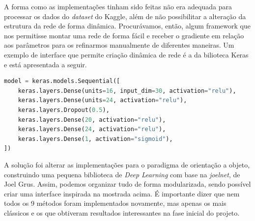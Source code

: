 \documentclass[11pt]{article}
\begin{document}
A forma como as implementações tinham sido feitas não era adequada para processar os dados do \textit{dataset} do Kaggle, além de não possibilitar a alteração da estrutura da rede de forma dinâmica. Procurávamos, então, algum framework que nos permitisse montar uma rede de forma fácil e receber o gradiente em relação aos parâmetros para os refinarmos manualmente de diferentes maneiras. Um exemplo de interface que permite criação dinâmica de rede é a da bilioteca Keras\cite{KERAS} e está apresentada a seguir.\\
\begin{lstlisting}[language=Python, caption=Interface do Keras]
model = keras.models.Sequential([
    keras.layers.Dense(units=16, input_dim=30, activation="relu"),
    keras.layers.Dense(units=24, activation="relu"),  
    keras.layers.Dropout(0.5),  
    keras.layers.Dense(20, activation="relu"),  
    keras.layers.Dense(24, activation="relu"),  
    keras.layers.Dense(1, activation="sigmoid"),  
])
\end{lstlisting}


\noindent
A solução foi alterar as implementações para o paradigma de orientação a objeto, construindo uma pequena biblioteca de \textit{Deep Learning} com base na \textit{joelnet}\cite{joelnet}, de Joel Grus. Assim, podemos organizar tudo de forma modularizada, sendo possível criar uma interface inspirada na mostrada acima. É importante dizer que nem todos os 9 métodos foram implementados novamente, mas apenas os mais clássicos e os que obtiveram resultados interessantes na fase inicial do projeto.
\end{document}
